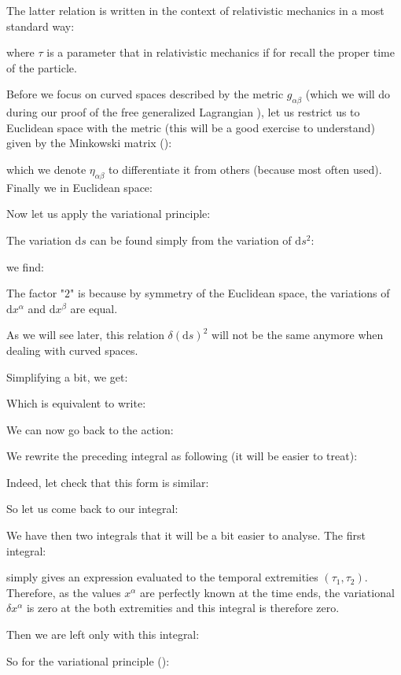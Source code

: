 	The latter relation is written in the context of relativistic mechanics in a most standard way:
	
	where $\tau$ is a parameter that in relativistic mechanics if for recall the proper time of the particle.
	
	Before we focus on curved spaces described by the metric $g_{\alpha\beta}$ (which we will do during our proof of the free generalized Lagrangian ), let us restrict us to Euclidean space with the metric (this will be a good exercise to understand) given by the Minkowski matrix ():
	
	which we denote $\eta_{\alpha\beta}$ to differentiate it from others (because most often used). Finally we in Euclidean space:
	
	Now let us apply the variational principle:
	
	The variation $\mathrm{d}s$ can be found simply from the variation of $\mathrm{d}s^2$:
	
	we find:
	
	The factor "$2$" is because by symmetry of the Euclidean space, the variations of $\mathrm{d}x^\alpha$ and $\mathrm{d}x^\beta$ are equal. 
	\begin{tcolorbox}[title=Remark,colframe=black,arc=10pt]
	As we will see later, this relation $\delta(\mathrm{d}s)^2$ will not be the same anymore when dealing with curved spaces.
	\end{tcolorbox}
	Simplifying a bit, we get:
	
	Which is equivalent to write:
	
	We can now go back to the action:
	
	We rewrite the preceding integral as following (it will be easier to treat):
	
	Indeed, let check that this form is similar:
	
	So let us come back to our integral:
	
	We have then two integrals that it will be a bit easier to analyse. The first integral:
	
	simply gives an expression evaluated to the temporal extremities $(\tau_1,\tau_2)$. Therefore, as the values  $x^\alpha$ are perfectly known at the time ends, the variational $\delta x^\alpha$ is zero at the both extremities and this integral is therefore zero.
	
	Then we are left only with this integral:
	
	So for the variational principle ():
	 
